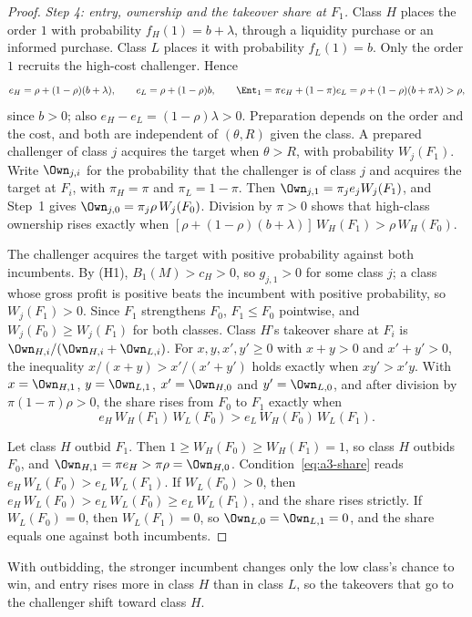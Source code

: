 \begin{proof}
\emph{Step 4: entry, ownership and the takeover share at \(F_1\).} Class \(H\) places the order \(1\) with
probability \(f_H(1)=b+\lambda\), through a liquidity purchase or an informed purchase. Class \(L\) places it with
probability \(f_L(1)=b\). Only the order \(1\) recruits the high-cost challenger. Hence
\[
e_H=\rho+(1-\rho)(b+\lambda),\qquad e_L=\rho+(1-\rho)b,\qquad
\Ent_1=\pi e_H+(1-\pi)e_L=\rho+(1-\rho)(b+\pi\lambda)>\rho ,
\]
since \(b>0\); also \(e_H-e_L=(1-\rho)\lambda>0\). Preparation depends on the order and the cost, and both are
independent of \((\theta,R)\) given the class. A prepared challenger of class \(j\) acquires the target when
\(\theta>R\), with probability \(W_j(F_1)\). Write \(\Own_{j,i}\) for the probability that the challenger is of class
\(j\) and acquires the target at \(F_i\), with \(\pi_H=\pi\) and \(\pi_L=1-\pi\). Then
\(\Own_{j,1}=\pi_je_jW_j(F_1)\), and Step~1 gives \(\Own_{j,0}=\pi_j\rho\,W_j(F_0)\). Division by \(\pi>0\) shows
that high-class ownership rises exactly when \([\rho+(1-\rho)(b+\lambda)]\,W_H(F_1)>\rho\,W_H(F_0)\).

The challenger acquires the target with positive probability against both incumbents. By (H1),
\(B_1(M)>c_H>0\), so \(g_{j,1}>0\) for some class \(j\); a class whose gross profit is positive beats the incumbent
with positive probability, so \(W_j(F_1)>0\). Since \(F_1\) strengthens \(F_0\), \(F_1\le F_0\) pointwise, and
\(W_j(F_0)\ge W_j(F_1)\) for both classes. Class \(H\)'s takeover share at \(F_i\) is
\(\Own_{H,i}/(\Own_{H,i}+\Own_{L,i})\). For \(x,y,x',y'\ge0\) with \(x+y>0\) and \(x'+y'>0\), the inequality
\(x/(x+y)>x'/(x'+y')\) holds exactly when \(xy'>x'y\). With \(x=\Own_{H,1}\), \(y=\Own_{L,1}\), \(x'=\Own_{H,0}\) and
\(y'=\Own_{L,0}\), and after division by \(\pi(1-\pi)\rho>0\), the share rises from \(F_0\) to \(F_1\) exactly when
\begin{equation}\label{eq:a3-share}
e_H\,W_H(F_1)\,W_L(F_0)>e_L\,W_H(F_0)\,W_L(F_1).
\end{equation}

Let class \(H\) outbid \(F_1\). Then \(1\ge W_H(F_0)\ge W_H(F_1)=1\), so class \(H\) outbids \(F_0\), and
\(\Own_{H,1}=\pi e_H>\pi\rho=\Own_{H,0}\). Condition~\eqref{eq:a3-share} reads \(e_H\,W_L(F_0)>e_L\,W_L(F_1)\). If
\(W_L(F_0)>0\), then \(e_H\,W_L(F_0)>e_L\,W_L(F_0)\ge e_L\,W_L(F_1)\), and the share rises strictly. If
\(W_L(F_0)=0\), then \(W_L(F_1)=0\), so \(\Own_{L,0}=\Own_{L,1}=0\), and the share equals one against both
incumbents.
\end{proof}

With outbidding, the stronger incumbent changes only the low class's chance to win, and entry rises more
in class \(H\) than in class \(L\), so the takeovers that go to the challenger shift toward class \(H\).
